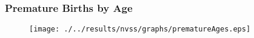 \documentclass[10pt,letterpaper,subeqn]{beamer}
\begin{document}
\begin{frame}[label=how]
\frametitle{Premature Births by Age}
\begin{figure}[htpb!]
  \centering
  \texttt{[image: ./../results/nvss/graphs/prematureAges.eps]}
\end{figure}
\end{frame}




%

%




%

%


%
\end{document}
